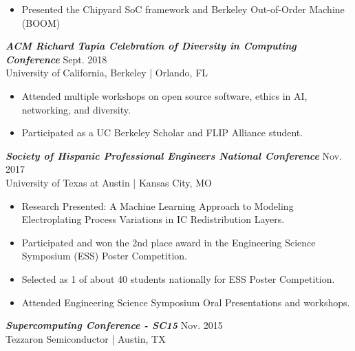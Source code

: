 \documentclass[letter]{res}
\begin{document}
\begin{resume}
 \vspace{-4mm}

 \begin{itemize}
 \item Presented the Chipyard SoC framework and Berkeley Out-of-Order Machine (BOOM)
 \end{itemize}

\vspace{-2mm}

{\sl \textbf{ACM Richard Tapia Celebration of Diversity in Computing Conference}} \hfill Sept. 2018\\
 University of California, Berkeley | Orlando, FL \newline

 \vspace{-4mm}

 \begin{itemize}
 \item Attended multiple workshops on open source software, ethics in AI, networking, and diversity.
 \item Participated as a UC Berkeley Scholar and FLIP Alliance student.
 \end{itemize}

\vspace{-2mm}

{\sl \textbf{Society of Hispanic Professional Engineers National Conference}} \hfill Nov. 2017\\
 University of Texas at Austin | Kansas City, MO \newline

 \vspace{-4mm}

 \begin{itemize}
 \item Research Presented: A Machine Learning Approach to Modeling Electroplating Process Variations in IC Redistribution Layers.
 \item Participated and won the 2nd place award in the Engineering Science Symposium (ESS) Poster Competition.
 \item Selected as 1 of about 40 students nationally for ESS Poster Competition.
 \item Attended Engineering Science Symposium Oral Presentations and workshops.
 \end{itemize}

\vspace{12mm}

{\sl \textbf{Supercomputing Conference - SC15}} \hfill Nov. 2015\\
Tezzaron Semiconductor | Austin, TX \newline


\end{resume}
\end{document}
